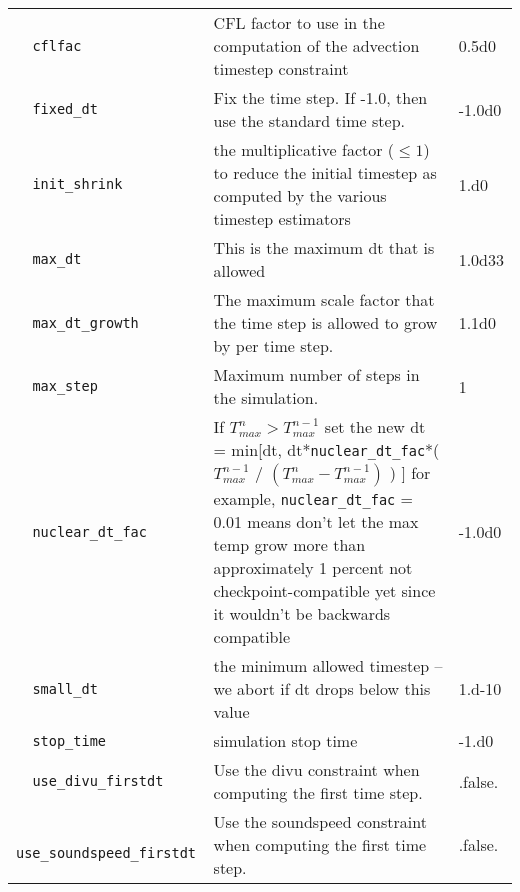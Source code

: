 \begin{landscape}
{\begin{center}
\begin{longtable}{|l|p{5.25in}|l|}
\hline 
\endlastfoot


\rowcolor{tableShade}
\verb=  cflfac  = &   CFL factor to use in the computation of the advection timestep constraint  &  0.5d0 \\
\verb=  fixed_dt  = &   Fix the time step.  If -1.0, then use the standard time step.  &  -1.0d0 \\
\rowcolor{tableShade}
\verb=  init_shrink  = &   the multiplicative factor ($\le 1$) to reduce the initial timestep as computed by the various timestep estimators  &  1.d0 \\
\verb=  max_dt  = &   This is the maximum dt that is allowed  &  1.0d33 \\
\rowcolor{tableShade}
\verb=  max_dt_growth  = &   The maximum scale factor that the time step is allowed to grow by per time step.  &  1.1d0 \\
\verb=  max_step  = &   Maximum number of steps in the simulation.  &  1 \\
\rowcolor{tableShade}
\verb=  nuclear_dt_fac  = &   If $T_{max}^n > T_{max}^{n-1}$ set the new dt =   min[dt, dt*{\tt nuclear\_dt\_fac}*( $T_{max}^{n-1}$ / $(T_{max}^n-T_{max}^{n-1})$ ) ] for example, {\tt nuclear\_dt\_fac} = 0.01 means don't let the max temp grow more than approximately 1 percent not checkpoint-compatible yet since it wouldn't be backwards compatible  &  -1.0d0 \\
\verb=  small_dt  = &   the minimum allowed timestep -- we abort if dt drops below this value  &  1.d-10 \\
\rowcolor{tableShade}
\verb=  stop_time  = &   simulation stop time  &  -1.d0 \\
\verb=  use_divu_firstdt  = &   Use the divu constraint when computing the first time step.  &  .false. \\
\rowcolor{tableShade}
\verb=  use_soundspeed_firstdt  = &   Use the soundspeed constraint when computing the first time step.  &  .false. \\


\end{longtable}
\end{center}

} %


\end{landscape}

%


